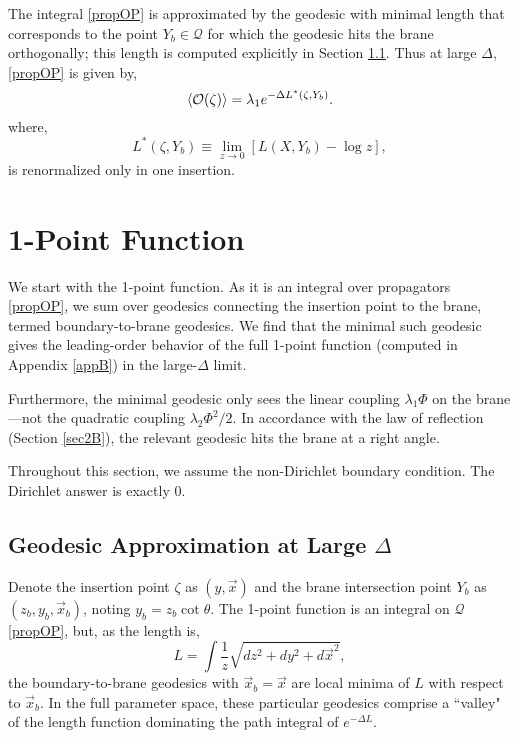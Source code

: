 \documentclass[reprint,amsmath,amssymb,aps,nofootinbib,twocolumn]{revtex4-2}
\begin{document}
The integral \eqref{propOP} is approximated by the geodesic with minimal length that corresponds to the point $ Y_b \in \mathcal{Q} $ for which the geodesic hits the brane orthogonally; this length is computed explicitly in Section \ref{sec3A}. Thus at large $ \Delta $, \eqref{propOP} is given by,
\begin{equation}
\expval{\mathcal{O}(\zeta)} = \lambda_1 e^{-\Delta L^{*}(\zeta,Y_b)}.\label{opGeoForm}
\end{equation}
where,
\begin{equation}
L^{*}(\zeta,Y_b) \equiv \lim_{z\rightarrow 0}[L(X,Y_b) - \log{z}],
\end{equation}
is renormalized only in one insertion.

\section{1-Point Function}\label{sec:1point}

We start with the 1-point function. As it is an integral over propagators \eqref{propOP}, we sum over geodesics connecting the insertion point to the brane, termed boundary-to-brane geodesics. We find that the minimal such geodesic gives the leading-order behavior of the full 1-point function (computed in Appendix \ref{appB}) in the large-$\Delta$ limit.

Furthermore, the minimal geodesic only sees the linear coupling $\lambda_1 \Phi$ on the brane---not the quadratic coupling $\lambda_2 \Phi^2/2$. In accordance with the law of reflection (Section \ref{sec2B}), the relevant geodesic hits the brane at a right angle.

Throughout this section, we assume the non-Dirichlet boundary condition. The Dirichlet answer is exactly $0$.

\subsection{Geodesic Approximation at Large $ \Delta $}\label{sec3A}

Denote the insertion point $\zeta$ as $(y,\vec{x})$ and the brane intersection point $Y_b$ as $(z_b,y_b,\vec{x}_b)$, noting $y_b = z_b\cot\theta$. The 1-point function is an integral on $\mathcal{Q}$ \eqref{propOP}, but, as the length is,
\begin{equation}
L = \int \frac{1}{z}\sqrt{dz^2 + dy^2 + d\vec{x}^2},
\end{equation}
the boundary-to-brane geodesics with $\vec{x}_b = \vec{x}$ are local minima of $L$ with respect to $\vec{x}_b$. In the full parameter space, these particular geodesics comprise a ``valley" of the length function dominating the path integral of $e^{-\Delta L}$.
\end{document}
